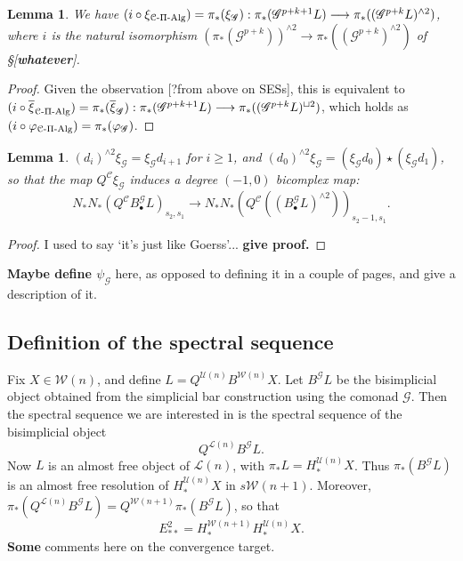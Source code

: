 \documentclass[11pt]{amsart}
\theoremstyle{plain}
\newtheorem{lem}[thm]{Lemma}
\theoremstyle{definition}
\let\phi\varphi
\renewcommand{\to}{\longrightarrow}
\newcommand{\scrG}{\mathscr{G}}
\newcommand{\calW}{\mathcal{W}}
\newcommand{\calU}{\mathcal{U}}
\newcommand{\calL}{\mathcal{L}}
\newcommand{\calC}{\mathcal{C}}
\theoremstyle{plain}
\newcommand{\BSW}{{\scrG}}
\newcommand{\BSWres}{B^\BSW}%
\newcommand{\PiAlg}{\textup{-$\Pi$-Alg}}
\begin{document}
\begin{Composite functor spectral sequences}
\begin{lem}\label{LemmaOn xi}
We have $(i\circ \xi_{\calC\PiAlg})=\pi_*(\xi_{\BSW}):\pi_*(\BSW^{p+k+1}L)\to\pi_*((\BSW^{p+k}L)^{\wedge 2})$, where $i$ is the natural isomorphism $(\pi_*(\BSW^{p+k}))^{\wedge 2}\to \pi_*((\BSW^{p+k})^{\wedge 2})$ of \S[\textbf{whatever}].
\end{lem}
\begin{proof}
Given the observation [?from above on SESs], this is equivalent to $(i\circ \overline{\xi}_{\calC\PiAlg})=\pi_*(\overline{\xi}_{\BSW}):\pi_*(\BSW^{p+k+1}L)\to\pi_*((\BSW^{p+k}L)^{\sqcup 2})$, which holds as $(i\circ\phi_{\calC\PiAlg})=\pi_*(\phi_{\BSW})$.
\end{proof}
\begin{lem}
$(d_i)^{\wedge 2}\xi_\BSW =\xi_\BSW d_{i+1}$ for $i\geq1$, and $(d_0)^{\wedge 2}\xi_\BSW = (\xi_\BSW d_{0})\star(\xi_\BSW d_{1})$, so that the map $Q^{\calC}\xi_\BSW $ induces a degree $(-1,0)$ bicomplex map:
\[N_*N_*(Q^{\calC}B^\BSW_{\bullet}L)_{s_2,s_1}\to
  N_*N_*(Q^{\calC}((B^\BSW_{\bullet}L)^{\wedge 2}))_{s_2-1,s_1}.\]
\end{lem}
\begin{proof}
I used to say `it's just like Goerss'... \textbf{give proof.}
\end{proof}
\textbf{Maybe define $\psi_\BSW$} here, as opposed to defining it in a couple of pages, and give a description of it.

\subsection{Definition of the spectral sequence}
Fix $X\in\calW(n)$, and define $L=Q^{\calU(n)}B^{\calW(n)}X$. Let $\BSWres L$ be the bisimplicial object obtained from the simplicial bar construction using the comonad $\BSW$. Then the spectral sequence we are interested in is the spectral sequence of the bisimplicial object
\[Q^{\calL(n)}\BSWres L.\]
Now $L$ is an almost free object of $\calL(n)$, with $\pi_*L=H_*^{\calU(n)}X$. Thus $\pi_*(\BSWres L)$ is an almost free resolution of $H_*^{\calU(n)}X$ in $s\calW(n+1)$. Moreover, $\pi_*(Q^{\calL(n)}\BSWres L)=Q^{\calW(n+1)}\pi_*(\BSWres L)$, so that
\[E^2_{**}=H_*^{\calW(n+1)}H_*^{\calU(n)}X.\]
\textbf{Some} comments here on the convergence target.


\end{Composite functor spectral sequences}
\end{document}

